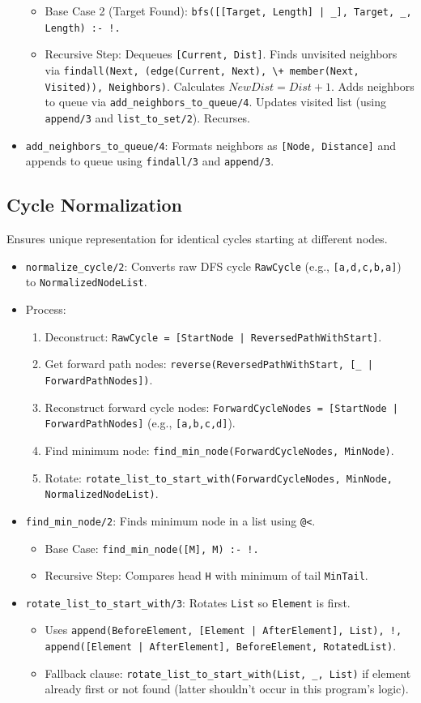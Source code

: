 \documentclass[12pt,a4paper]{article}
\begin{document}
\begin{itemize}
\begin{itemize}
\item Base Case 2 (Target Found): \texttt{bfs([[Target, Length] | \_], Target, \_, Length) :- !.}
\item Recursive Step: Dequeues \texttt{[Current, Dist]}. Finds unvisited neighbors via \texttt{findall(Next, (edge(Current, Next), \textbackslash+ member(Next, Visited)), Neighbors)}. Calculates $NewDist = Dist + 1$. 
 Adds neighbors to queue via \texttt{add\_neighbors\_to\_queue/4}. Updates visited list (using \texttt{append/3} and \texttt{list\_to\_set/2}). Recurses.
\end{itemize}
\item \texttt{add\_neighbors\_to\_queue/4}: Formats neighbors as \texttt{[Node, Distance]} and appends to queue using \texttt{findall/3} and \texttt{append/3}.
\end{itemize}
\subsection{Cycle Normalization}
Ensures unique representation for identical cycles starting at different nodes.
\begin{itemize}
\item \texttt{normalize\_cycle/2}: Converts raw DFS cycle \texttt{RawCycle} (e.g., \texttt{[a,d,c,b,a]}) to \texttt{NormalizedNodeList}.
\item Process:
\begin{enumerate}
\item Deconstruct: \texttt{RawCycle = [StartNode | ReversedPathWithStart]}.
\item Get forward path nodes: \texttt{reverse(ReversedPathWithStart, [\_ | ForwardPathNodes])}.
\item Reconstruct forward cycle nodes: \texttt{ForwardCycleNodes = [StartNode | ForwardPathNodes]} (e.g., \texttt{[a,b,c,d]}).
\item Find minimum node: \texttt{find\_min\_node(ForwardCycleNodes, MinNode)}.
\item Rotate: \texttt{rotate\_list\_to\_start\_with(ForwardCycleNodes, MinNode, NormalizedNodeList)}.
\end{enumerate}
\item \texttt{find\_min\_node/2}: Finds minimum node in a list using \texttt{@<}.
\begin{itemize}
\item Base Case: \texttt{find\_min\_node([M], M) :- !.}
\item Recursive Step: Compares head \texttt{H} with minimum of tail \texttt{MinTail}.
\end{itemize}
\item \texttt{rotate\_list\_to\_start\_with/3}: Rotates \texttt{List} so \texttt{Element} is first.
\begin{itemize}
\item Uses \texttt{append(BeforeElement, [Element | AfterElement], List), !, append([Element | AfterElement], BeforeElement, RotatedList)}.
\item Fallback clause: \texttt{rotate\_list\_to\_start\_with(List, \_, List)} if element already first or not found (latter shouldn't occur in this program's logic).
\end{itemize}
\end{itemize}
\end{document}
